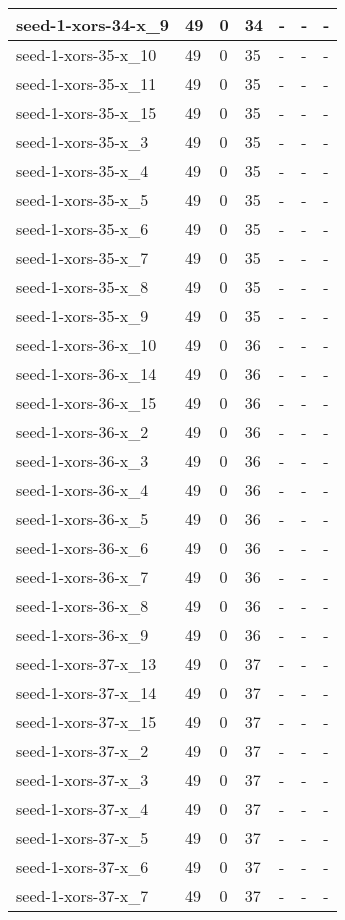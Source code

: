 \begin{scriptsize}
\begin{longtable}{|p{5cm}|l|l|l|l|l|l|}
seed-1-xors-34-x\_9&49&0&34&-&-&- \\ \hline 
seed-1-xors-35-x\_10&49&0&35&-&-&- \\ \hline 
seed-1-xors-35-x\_11&49&0&35&-&-&- \\ \hline 
seed-1-xors-35-x\_15&49&0&35&-&-&- \\ \hline 
seed-1-xors-35-x\_3&49&0&35&-&-&- \\ \hline 
seed-1-xors-35-x\_4&49&0&35&-&-&- \\ \hline 
seed-1-xors-35-x\_5&49&0&35&-&-&- \\ \hline 
seed-1-xors-35-x\_6&49&0&35&-&-&- \\ \hline 
seed-1-xors-35-x\_7&49&0&35&-&-&- \\ \hline 
seed-1-xors-35-x\_8&49&0&35&-&-&- \\ \hline 
seed-1-xors-35-x\_9&49&0&35&-&-&- \\ \hline 
seed-1-xors-36-x\_10&49&0&36&-&-&- \\ \hline 
seed-1-xors-36-x\_14&49&0&36&-&-&- \\ \hline 
seed-1-xors-36-x\_15&49&0&36&-&-&- \\ \hline 
seed-1-xors-36-x\_2&49&0&36&-&-&- \\ \hline 
seed-1-xors-36-x\_3&49&0&36&-&-&- \\ \hline 
seed-1-xors-36-x\_4&49&0&36&-&-&- \\ \hline 
seed-1-xors-36-x\_5&49&0&36&-&-&- \\ \hline 
seed-1-xors-36-x\_6&49&0&36&-&-&- \\ \hline 
seed-1-xors-36-x\_7&49&0&36&-&-&- \\ \hline 
seed-1-xors-36-x\_8&49&0&36&-&-&- \\ \hline 
seed-1-xors-36-x\_9&49&0&36&-&-&- \\ \hline 
seed-1-xors-37-x\_13&49&0&37&-&-&- \\ \hline 
seed-1-xors-37-x\_14&49&0&37&-&-&- \\ \hline 
seed-1-xors-37-x\_15&49&0&37&-&-&- \\ \hline 
seed-1-xors-37-x\_2&49&0&37&-&-&- \\ \hline 
seed-1-xors-37-x\_3&49&0&37&-&-&- \\ \hline 
seed-1-xors-37-x\_4&49&0&37&-&-&- \\ \hline 
seed-1-xors-37-x\_5&49&0&37&-&-&- \\ \hline 
seed-1-xors-37-x\_6&49&0&37&-&-&- \\ \hline 
seed-1-xors-37-x\_7&49&0&37&-&-&- \\ \hline 

\end{longtable}
\end{scriptsize}
